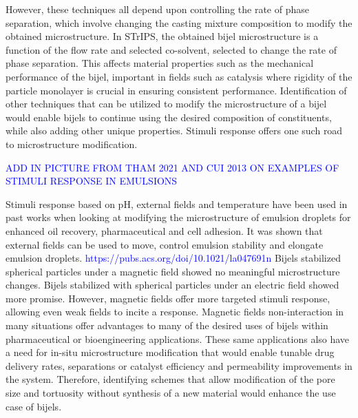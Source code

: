 However, these techniques all depend upon controlling the rate of phase separation, which involve changing the casting mixture composition to modify the obtained microstructure. In STrIPS, the obtained bijel microstructure is a function of the flow rate and selected co-solvent, selected to change the rate of phase separation. \cite{haase_continuous_2015} This affects material properties such as the mechanical performance of the bijel, important in fields such as catalysis where rigidity of the particle monolayer is crucial in ensuring consistent performance. \cite{reeves_particle-size_2015, haase_situ_2016, boakye-ansah_controlling_2020} Identification of other techniques that can be utilized to modify the microstructure of a bijel would enable bijels to continue using the desired composition of constituents, while also adding other unique properties. Stimuli response offers one such road to microstructure modification.

\textcolor{blue}{ADD IN PICTURE FROM THAM 2021 AND CUI 2013 ON EXAMPLES OF STIMULI RESPONSE IN EMULSIONS}

Stimuli response based on pH, external fields and temperature have been used in past works when looking at modifying the microstructure of emulsion droplets for enhanced oil recovery, pharmaceutical and cell adhesion. \cite{haase_nanoparticle_2011, tham_magnetophoresis_2021, cui_stabilizing_2013, manfredini_limonene--water_2021}  It was shown that external fields can be used to move, control emulsion stability and elongate emulsion droplets. \cite{tham_magnetophoresis_2021, cui_stabilizing_2013} \textcolor{blue}{https://pubs.acs.org/doi/10.1021/la047691n} Bijels stabilized spherical particles under a magnetic field showed no meaningful microstructure changes. \cite{kim_bijels_2010} Bijels stabilized with spherical particles under an electric field showed more promise. \cite{carmack_tuning_2018} However, magnetic fields offer more targeted stimuli response, allowing even weak fields to incite a response. Magnetic fields non-interaction in many situations offer advantages to many of the desired uses of bijels within pharmaceutical or bioengineering applications. \cite{vanoli_bijels_2022, thorson_bijel-templated_2019, thorson_composite_2018} These same applications also have a need for in-situ microstructure modification that would enable tunable drug delivery rates, separations or catalyst efficiency and permeability improvements in the system. Therefore, identifying schemes that allow modification of the pore size and tortuosity  without synthesis of a new material would enhance the use case of bijels. 

